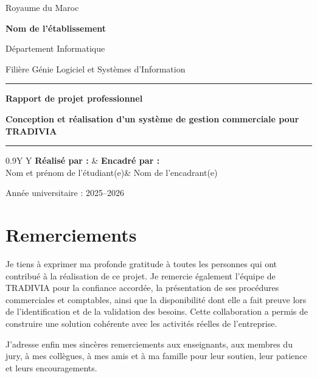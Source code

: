 \documentclass[12pt,a4paper,oneside]{report}
\newcommand{\Etablissement}{Nom de l'établissement}
\newcommand{\Departement}{Département Informatique}
\newcommand{\Filiere}{Filière Génie Logiciel et Systèmes d'Information}
\newcommand{\Auteur}{Nom et prénom de l'étudiant(e)}
\newcommand{\Encadrant}{Nom de l'encadrant(e)}
\newcommand{\AnneeUniversitaire}{2025--2026}
\newcommand{\TitreProjet}{Conception et réalisation d'un système de gestion commerciale pour TRADIVIA}
\begin{document}
\begin{titlepage}
\begin{center}
{\large Royaume du Maroc}\par
\vspace{0.3cm}
{\Large\bfseries \Etablissement}\par
{\large \Departement}\par
{\large \Filiere}\par
\vspace{1.2cm}
\textcolor{tradiviablue}{\rule{\textwidth}{1.2pt}}\par
\vspace{0.6cm}
{\LARGE\bfseries Rapport de projet professionnel}\par
\vspace{0.7cm}
{\Huge\bfseries\color{tradiviablue}\TitreProjet}\par
\vspace{0.5cm}
\textcolor{tradiviagold}{\rule{0.75\textwidth}{2pt}}\par
\vfill
\begin{tabularx}{0.9\textwidth}{Y Y}
\textbf{Réalisé par :} & \textbf{Encadré par :}\\[0.3cm]
\Auteur & \Encadrant\\
\end{tabularx}
\vfill
{\large Année universitaire : \AnneeUniversitaire}
\end{center}
\end{titlepage}

\setcounter{page}{2}

\chapter*{Remerciements}
Je tiens à exprimer ma profonde gratitude à toutes les personnes qui ont contribué à la réalisation de ce projet. Je remercie également l'équipe de TRADIVIA pour la confiance accordée, la présentation de ses procédures commerciales et comptables, ainsi que la disponibilité dont elle a fait preuve lors de l'identification et de la validation des besoins. Cette collaboration a permis de construire une solution cohérente avec les activités réelles de l'entreprise.

J'adresse enfin mes sincères remerciements aux enseignants, aux membres du jury, à mes collègues, à mes amis et à ma famille pour leur soutien, leur patience et leurs encouragements.
\end{document}
